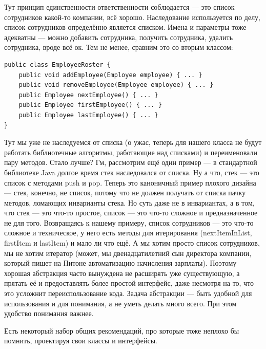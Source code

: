 \documentclass[a5paper]{article}
\begin{document}
Тут принцип единственности ответственности соблюдается --- это список сотрудников какой-то компании, всё хорошо. Наследование используется по делу, список сотрудников определённо является списком. Имена и параметры тоже адекватны --- можно добавить сотрудника, получить сотрудника, удалить сотрудника, вроде всё ок. Тем не менее, сравним это со вторым классом:

\begin{verbatim}
public class EmployeeRoster {
    public void addEmployee(Employee employee) { ... }
    public void removeEmployee(Employee employee) { ... }
    public Employee nextEmployee() { ... }
    public Employee firstEmployee() { ... }
    public Employee lastEmployee() { ... }
}
\end{verbatim}

Тут мы уже не наследуемся от списка (о ужас, теперь для нашего класса не будут работать библиотечные алгоритмы, работающие над списками) и переименовали пару методов. Стало лучше? Гм, рассмотрим ещё один пример --- в стандартной библиотеке Java долгое время стек наследовался от списка. Ну а что, стек --- это список с методами push и pop. Теперь это каноничный пример плохого дизайна --- стек, конечно, не список, потому что не должен получать от списка пачку методов, ломающих инварианты стека. Но суть даже не в инвариантах, а в том, что стек --- это что-то простое, список --- это что-то сложное и предназначенное не для того. Возвращаясь к нашему примеру, список сотрудников --- это что-то сложное и техническое, у него есть методы для итерирования (nextItemInList, firstItem и lastItem) и мало ли что ещё. А мы хотим просто список сотрудников, мы не хотим итератор (может, мы двенадцатилетний сын директора компании, который пишет на Питоне автоматизацию начисления зарплаты). Поэтому хорошая абстракция часто вынуждена не расширять уже существующую, а прятать её и предоставлять более простой интерфейс, даже несмотря на то, что это усложнит переиспользование кода. Задача абстракции --- быть удобной для использования и для понимания, а не уметь делать много всего. При этом удобство понимания важнее.

Есть некоторый набор общих рекомендаций, про которые тоже неплохо бы помнить, проектируя свои классы и интерфейсы.
\end{document}
